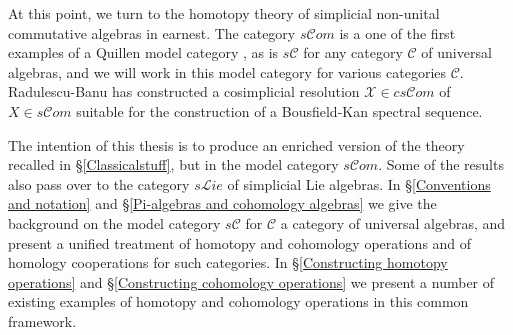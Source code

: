 \documentclass[11pt]{amsart} \renewcommand{\baselinestretch}{1.2}
\theoremstyle{plain}
\theoremstyle{definition}
\newcommand{\scrL}{\mathscr{L}}
\newcommand{\scrC}{\mathscr{C}}
\newcommand{\calx}{\mathcal{X}}
\newcommand{\calc}{\mathcal{C}}
\newcommand{\F}{\mathbb{F}}
\newcommand{\algs}{{\scrC\!\textit{om}}}
\newcommand{\liealgs}{{\scrL\!\textit{ie}}}
\newcommand{\Ftwo}{\F_2}
\begin{document}
\begin{Introduction}
At this point, we turn to the homotopy theory of simplicial non-unital commutative algebras in earnest. The category $s\algs$ is a one of the first examples of a Quillen model category \cite{QuillenHomAlg.pdf}, as is $s\calc$ for any category $\calc$ of universal algebras, and we will work in this model category for various categories $\calc$.
Radulescu-Banu \cite{Radulescu-Banu.pdf} has constructed a cosimplicial resolution $\calx\in cs\algs$ of $X\in s\algs$ suitable for the construction of a Bousfield-Kan spectral sequence.
%
%

The intention of this thesis is to produce an enriched version of the theory recalled in \S\ref{Classicalstuff}, but in the model category $s\algs$. Some of the results also pass over to the category $s\liealgs$ of simplicial Lie algebras.  
In \S\ref{Conventions and notation} and \S\ref{Pi-algebras and cohomology algebras} we give the background on the model category $s\calc$ for $\calc$ a category of universal algebras, and present a unified treatment of homotopy and cohomology operations and of homology cooperations for such categories. In \S\ref{Constructing homotopy operations} and \S\ref{Constructing cohomology operations} we present a number of existing examples of homotopy and cohomology operations in this common framework.



\end{Introduction}
\end{document}
